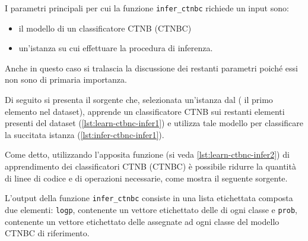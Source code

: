 I parametri principali per cui la funzione \lstinline[language=rstats]{infer_ctnbc} richiede un input sono:
\begin{itemize}
	\item il modello di un classificatore \acs{CTNB} (\acs{CTNBC})
	\item un'istanza su cui effettuare la procedura di inferenza.
\end{itemize}
Anche in questo caso si tralascia la discussione dei restanti parametri poiché essi non sono di primaria importanza.

Di seguito si presenta il sorgente che, selezionata un'istanza dal  (\ie{} il primo elemento nel dataset), apprende un classificatore \acs{CTNB} sui restanti elementi presenti del dataset (\autoref{lst:learn-ctbnc-infer1}) e utilizza tale modello per classificare la succitata istanza (\autoref{lst:infer-ctbnc-infer1}).

\vspace*{8pt}

Come detto, utilizzando l'apposita funzione (si veda \autoref{lst:learn-ctbnc-infer2}) di apprendimento dei classificatori \acs{CTNB} (\acs{CTNBC}) è possibile ridurre la quantità di linee di codice e di operazioni necessarie, come mostra il seguente sorgente.

\vspace*{8pt}

L'output della funzione \lstinline[language=rstats]{infer_ctnbc} consiste in una lista etichettata composta due elementi: \lstinline$logp$, contenente un vettore etichettato delle \emph{} di ogni classe e \lstinline$prob$, contenente un vettore etichettato delle \emph{} assegnate ad ogni classe del modello \acs{CTNBC} di riferimento.

\vspace*{8pt}\vspace*{8pt}

